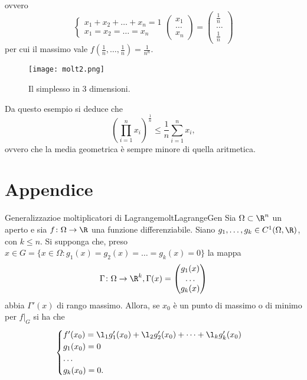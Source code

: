 \begin{ese}
\[	\]
	ovvero
	\[
		\begin{cases}
			x_1+x_2+\dots+x_n=1 \\
			x_1=x_2=\ldots=x_n
		\end{cases}
		\begin{pmatrix}
			x_1   \\
			\dots \\
			x_n
		\end{pmatrix}
		=
		\begin{pmatrix}
			\frac{1}{n} \\
			\dots       \\
			\frac{1}{n}
		\end{pmatrix}
	\]
	per cui il massimo vale \(f(\frac{1}{n},\dots,\frac{1}{n})=\frac{1}{n^n}\).
\end{ese}

\begin{figure}[htp]
	\begin{centering}
		\texttt{[image: molt2.png]}
		\caption{Il simplesso in \(3\) dimensioni.}
		\label{fig:molt2}
	\end{centering}
\end{figure}

\begin{oss}
	Da questo esempio si deduce che
	\[
		\left(\prod_{i=1}^n x_i\right)^{\frac{1}{n}}\le\frac{1}{n}\sum_{i=1}^n x_i,
	\]
	ovvero che la media geometrica è sempre minore di quella aritmetica.
\end{oss}
%
%
\section{Appendice}

\begin{teor}{Generalizzazioe moltiplicatori di Lagrange}{moltLagrangeGen}
	Sia \(\Omega\subset\R^n\) un aperto e sia \(f\colon \Omega\to\R\) una funzione differenziabile.
	Siano \(g_1,\dots,g_k\in C^1(\Omega,\R)\), con \(k\le n\).
	Si supponga che, preso \(x\in G=\{x\in\Omega:g_1(x)=g_2(x)=\ldots=g_k(x)=0\}\) la mappa
	\[
		\Gamma\colon\Omega\to\R^k,\Gamma(x)=
		\begin{pmatrix}
			g_1(x) \\
			\dots  \\
			g_k(x)
		\end{pmatrix}
	\]
	abbia \(\Gamma'(x)\) di rango massimo.
	Allora, se \(x_0\) è un punto di massimo o di minimo per \(f|_G\) si ha che
	\[
		\begin{cases}
			f'(x_0)=\l_1 g'_1(x_0)+\l_2 g'_2(x_0)+\dots+\l_k g'_k(x_0) \\
			g_1(x_0)=0                                                 \\
			\dots                                                      \\
			g_k(x_0)=0.
		\end{cases}
	\]
\end{teor}

